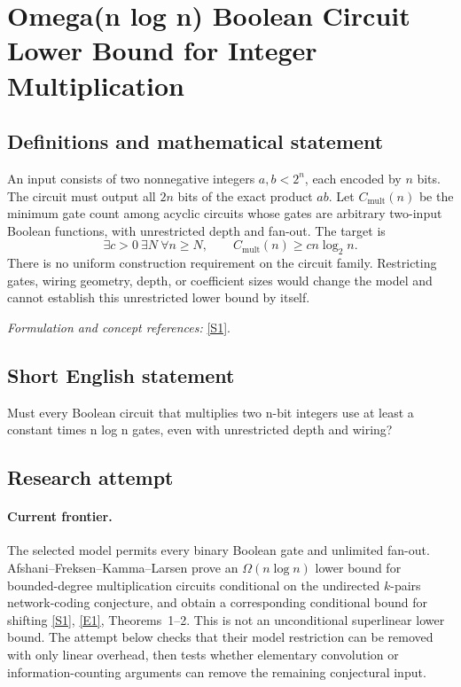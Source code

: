 \documentclass[11pt,a4paper]{article}
\newcommand{\sref}[2]{\hyperlink{source:#1:#2}{[S#2]}}
\newcommand{\eref}[2]{\hyperlink{extra:#1:#2}{[E#2]}}
\newif\ifshowcatalogue
\newcommand{\cataloguescope}[1]{\ifshowcatalogue
 \paragraph{Exact scope in the supplied catalogue.}
 \begin{quote}\small #1\end{quote}\fi}
\numberwithin{equation}{section}
\begin{document}
\setcounter{section}{0}
\clearpage
\section*{\texorpdfstring{Omega(n log n) Boolean Circuit Lower Bound for Integer Multiplication}{Omega(n log n) Boolean Circuit Lower Bound for Integer Multiplication}}\label{statement}
\subsection{Definitions and mathematical statement}
An input consists of two nonnegative integers $a,b<2^n$, each encoded by $n$ bits. The circuit must output all $2n$ bits of the exact product $ab$. Let $C_{\mathrm{mult}}(n)$ be the minimum gate count among acyclic circuits whose gates are arbitrary two-input Boolean functions, with unrestricted depth and fan-out. The target is
\[
 \exists c>0\ \exists N\ \forall n\ge N,
 \qquad C_{\mathrm{mult}}(n)\ge c n\log_2n.
\]
There is no uniform construction requirement on the circuit family. Restricting gates, wiring geometry, depth, or coefficient sizes would change the model and cannot establish this unrestricted lower bound by itself.
\par\smallskip\textit{Formulation and concept references:} \sref{statement}{1}.
\cataloguescope{Let C\_mult(n) be the least gate count of an acyclic Boolean circuit with 2n input bits, all 2n output bits of the product of the two nonnegative n-bit inputs, arbitrary binary Boolean gates, unrestricted fan-out and depth, and no uniformity requirement. There exist constants c>0 and N such that C\_mult(n)>=c*n*log2(n) for every n>=N.}
\subsection{Short English statement}
Must every Boolean circuit that multiplies two n-bit integers use at least a constant times n log n gates, even with unrestricted depth and wiring?
\subsection{Research attempt}

\paragraph{Current frontier.}
The selected model permits every binary Boolean gate and unlimited fan-out. Afshani--Freksen--Kamma--Larsen prove an $\Omega(n\log n)$ lower bound for bounded-degree multiplication circuits conditional on the undirected $k$-pairs network-coding conjecture, and obtain a corresponding conditional bound for shifting \sref{statement}{1}, \eref{statement}{1}, Theorems~1--2. This is not an unconditional superlinear lower bound. The attempt below checks that their model restriction can be removed with only linear overhead, then tests whether elementary convolution or information-counting arguments can remove the remaining conjectural input.
\end{document}
